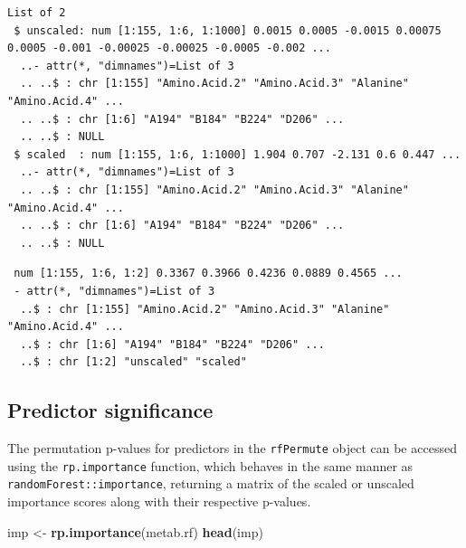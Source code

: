 \documentclass[]{article}
\newenvironment{Shaded}{\begin{snugshade}}{\end{snugshade}}
\newcommand{\KeywordTok}[1]{\textcolor[rgb]{0.13,0.29,0.53}{\textbf{{#1}}}}
\newcommand{\StringTok}[1]{\textcolor[rgb]{0.31,0.60,0.02}{{#1}}}
\newcommand{\NormalTok}[1]{{#1}}
\begin{document}
\begin{verbatim}
List of 2
 $ unscaled: num [1:155, 1:6, 1:1000] 0.0015 0.0005 -0.0015 0.00075 0.0005 -0.001 -0.00025 -0.00025 -0.0005 -0.002 ...
  ..- attr(*, "dimnames")=List of 3
  .. ..$ : chr [1:155] "Amino.Acid.2" "Amino.Acid.3" "Alanine" "Amino.Acid.4" ...
  .. ..$ : chr [1:6] "A194" "B184" "B224" "D206" ...
  .. ..$ : NULL
 $ scaled  : num [1:155, 1:6, 1:1000] 1.904 0.707 -2.131 0.6 0.447 ...
  ..- attr(*, "dimnames")=List of 3
  .. ..$ : chr [1:155] "Amino.Acid.2" "Amino.Acid.3" "Alanine" "Amino.Acid.4" ...
  .. ..$ : chr [1:6] "A194" "B184" "B224" "D206" ...
  .. ..$ : NULL
\end{verbatim}

\begin{Shaded}
\end{Shaded}

\begin{verbatim}
 num [1:155, 1:6, 1:2] 0.3367 0.3966 0.4236 0.0889 0.4565 ...
 - attr(*, "dimnames")=List of 3
  ..$ : chr [1:155] "Amino.Acid.2" "Amino.Acid.3" "Alanine" "Amino.Acid.4" ...
  ..$ : chr [1:6] "A194" "B184" "B224" "D206" ...
  ..$ : chr [1:2] "unscaled" "scaled"
\end{verbatim}

\subsection{Predictor significance}\label{predictor-significance}

The permutation p-values for predictors in the \texttt{rfPermute} object
can be accessed using the \texttt{rp.importance} function, which behaves
in the same manner as \texttt{randomForest::importance}, returning a
matrix of the scaled or unscaled importance scores along with their
respective p-values.

\begin{Shaded}
\begin{Highlighting}[]
\NormalTok{imp <-}\StringTok{ }\KeywordTok{rp.importance}\NormalTok{(metab.rf)}
\KeywordTok{head}\NormalTok{(imp)}
\end{Highlighting}
\end{Shaded}
\end{document}
